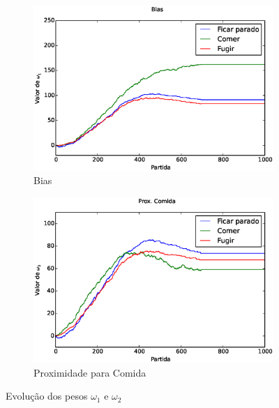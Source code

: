 \begin{figure}[h]
	\centering
	\begin{subfigure}[t]{.5\textwidth}
		\centering
		\includegraphics[width=\linewidth]{images/3_behaviors_original_map/weights____pol__Bias}
		\caption{Bias}
		\label{img:3ComportamentosMapaOriginal:PesoBias}
	\end{subfigure}%
	\begin{subfigure}[t]{.5\textwidth}
		\centering
		\includegraphics[width=\linewidth]{images/3_behaviors_original_map/weights____pol__DistComida}
		\caption{Proximidade para Comida}
		\label{img:3ComportamentosMapaOriginal:PesoDistComida}
	\end{subfigure}
	\caption{Evolução dos pesos $ \omega_1 $ e $ \omega_2 $}
	\label{img:3ComportamentosMapaOriginal:PesoBiasAndDistComida}
\end{figure}

